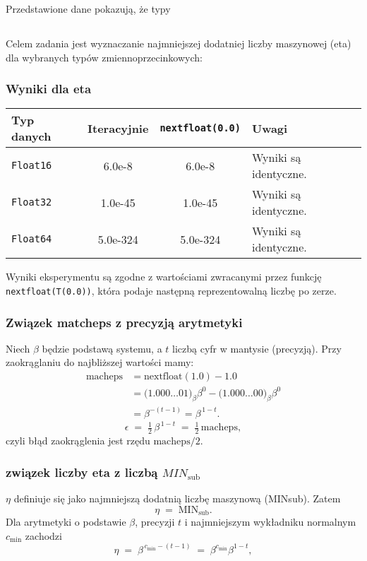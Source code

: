 \documentclass[a4paper,12pt]{article}
\begin{document}
Przedstawione dane pokazują, że typy

\subsection{}

Celem zadania jest wyznaczanie najmniejszej dodatniej liczby maszynowej (eta) dla wybranych typów zmiennoprzecinkowych:

\subsubsection*{Wyniki dla eta}
\begin{center}
\begin{tabular}{l c c l}
\hline
Typ danych & Iteracyjnie & \texttt{nextfloat(0.0)} & Uwagi \\
\hline
\texttt{Float16} & 6.0e-8 & 6.0e-8 & Wyniki są identyczne. \\
\texttt{Float32} & 1.0e-45 & 1.0e-45 & Wyniki są identyczne. \\
\texttt{Float64} & 5.0e-324 & 5.0e-324 & Wyniki są identyczne. \\
\hline
\end{tabular}
\end{center}

Wyniki eksperymentu są zgodne z wartościami zwracanymi przez funkcję \texttt{nextfloat(T(0.0))}, która podaje następną reprezentowalną liczbę po zerze.

\subsubsection{Związek matcheps z precyzją arytmetyki}
Niech $\beta$ będzie podstawą systemu, a $t$ liczbą cyfr w mantysie (precyzją). Przy zaokrąglaniu do najbliższej wartości mamy:
\begin{align}
\mathrm{macheps} &= \mathrm{nextfloat}(1.0) - 1.0 \\
&= \bigl(1.000\ldots01\bigr)_\beta\beta^{0} - \bigl(1.000\ldots00\bigr)_\beta\beta^{0} \\
&= \beta^{-(t-1)} = \beta^{\,1-t}.
\end{align}
\[
\epsilon \;=\; \tfrac{1}{2}\,\beta^{\,1-t} \;=\; \tfrac{1}{2}\,\mathrm{macheps},
\]
czyli błąd zaokrąglenia jest rzędu $\mathrm{macheps}/2$.

\subsubsection{związek liczby eta z liczbą \(MIN_{\text{sub}}\)}
\(\eta\) definiuje się jako najmniejszą dodatnią liczbę maszynową (MINsub). Zatem
\[
\eta \;=\; \mathrm{MIN_{\text{sub}}}.
\]
Dla arytmetyki o podstawie \(\beta\), precyzji \(t\) i najmniejszym wykładniku normalnym \(c_{\min}\) zachodzi
\[
\eta \;=\; \beta^{\,c_{\min}-(t-1)} \;=\; \beta^{c_{\min}}\beta^{1-t},
\]
\end{document}
